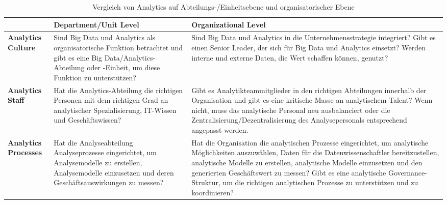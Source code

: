 \begin{table}[htb]
    \centering
    \begin{tabular}{>{\raggedright\arraybackslash}m{2.5cm} >{\raggedright\arraybackslash}m{5cm} >{\raggedright\arraybackslash}m{5cm}}
    \toprule
     & \textbf{Department/Unit Level} & \textbf{Organizational Level} \\ \midrule
    \textbf{Analytics Culture} & Sind Big Data und Analytics als organisatorische Funktion betrachtet und gibt es eine Big Data/Analytics-Abteilung oder -Einheit, um diese Funktion zu unterstützen? & Sind Big Data und Analytics in die Unternehmensstrategie integriert? Gibt es einen Senior Leader, der sich für Big Data und Analytics einsetzt? Werden interne und externe Daten, die Wert schaffen können, genutzt? \\ \midrule
    \textbf{Analytics Staff} & Hat die Analytics-Abteilung die richtigen Personen mit dem richtigen Grad an analytischer Spezialisierung, IT-Wissen und Geschäftswissen? & Gibt es Analytikteammitglieder in den richtigen Abteilungen innerhalb der Organisation und gibt es eine kritische Masse an analytischem Talent? Wenn nicht, muss das analytische Personal neu ausbalanciert oder die Zentralisierung/Dezentralisierung des Analysepersonals entsprechend angepasst werden. \\ \midrule
    \textbf{Analytics Processes} & Hat die Analyseabteilung Analyseprozesse eingerichtet, um Analysemodelle zu erstellen, Analysemodelle einzusetzen und deren Geschäftsauswirkungen zu messen? & Hat die Organisation die analytischen Prozesse eingerichtet, um analytische Möglichkeiten auszuwählen, Daten für die Datenwissenschaftler bereitzustellen, analytische Modelle zu erstellen, analytische Modelle einzusetzen und den generierten Geschäftswert zu messen? Gibt es eine analytische Governance-Struktur, um die richtigen analytischen Prozesse zu unterstützen und zu koordinieren? \\ \bottomrule
    \end{tabular}
    \caption{Vergleich von Analytics auf Abteilungs-/Einheitsebene und organisatorischer Ebene}
\end{table}